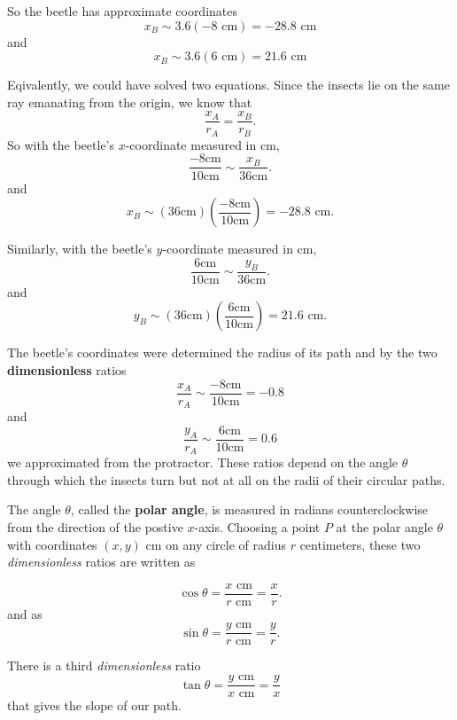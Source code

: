 \documentclass{ximera}
\begin{document}
\begin{question}
\begin{expandable}
So the beetle has approximate coordinates
\[
   x_B \sim 3.6(-8\text{ cm}) = -28.8 \text{ cm}
\]
and
\[
  x_B \sim 3.6(6\text{ cm}) = 21.6 \text{ cm}
\]

Eqivalently, we could have solved two equations. Since the insects lie on the same ray emanating from the origin, we know that
\[
  \frac{x_A}{r_A} = \frac{x_B}{r_B}.
\]
So with the beetle's $x$-coordinate measured in cm,
\[
      \frac{-8\text{cm}}{10\text{cm}} \sim \frac{x_B}{36\text{cm}}.
\]
and
\[
 x_B \sim (36\text{cm}) \left( \frac{-8\text{cm}}{10\text{cm}} \right) = -28.8\text{ cm} .
\]

Similarly, with the beetle's $y$-coordinate measured in cm,
\[
      \frac{6\text{cm}}{10\text{cm}} \sim \frac{y_B}{36\text{cm}}.
\]
and
\[
 y_B \sim (36\text{cm}) \left( \frac{6\text{cm}}{10\text{cm}} \right) = 21.6\text{ cm} .
\]


The beetle's coordinates were determined the radius of its path and by the two {\bf dimensionless} ratios
\[
    \frac{x_A}{r_A} \sim \frac{-8\text{cm}}{10\text{cm}} = -0.8
\] 
and
\[
   \frac{y_A}{r_A} \sim \frac{6\text{cm}}{10\text{cm}} = 0.6 
\]
we approximated from the protractor. These ratios depend on the angle $\theta$ through which the insects turn but not at all on the radii of their circular paths. 

The angle $\theta$, called the {\bf polar angle}, is measured in radians counterclockwise from the direction of the postive $x$-axis. Choosing a point $P$ at the polar angle $\theta$ with coordinates $(x,y)$ cm on any circle of radius $r$ centimeters, these two \emph{dimensionless} ratios are written as

\[
   \cos \theta = \frac{x \text{ cm}}{r \text{ cm}} = \frac{x}{r} .
\]
and as
\[
   \sin \theta = \frac{y \text{ cm}}{r \text{ cm}} = \frac{y}{r} .
\]

There is a third \emph{dimensionless} ratio 
\[
  \tan \theta = \frac{y \text{ cm}}{x \text{ cm}} = \frac{y}{x}
\]
that gives the slope of our path. 


\end{expandable}




\end{question}



\end{document}
